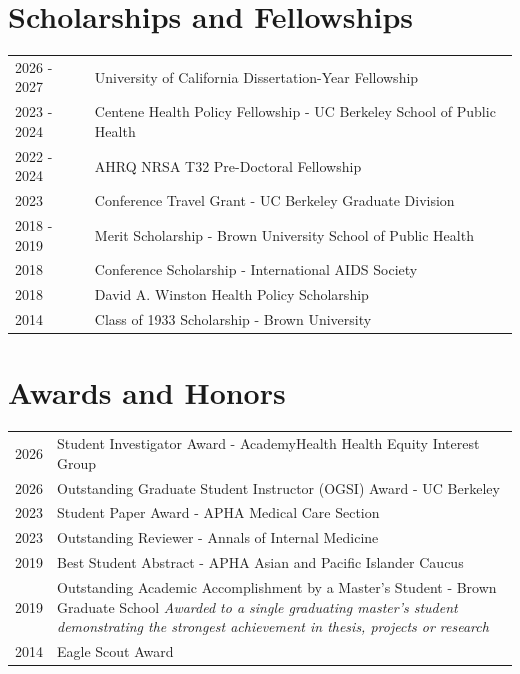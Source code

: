\documentclass[letterpaper,11pt]{article}
\begin{document}
\section{Scholarships and Fellowships}
\begin{tabularx}{\linewidth}{@{}l X@{}}	
2026 - 2027 & University of California Dissertation-Year Fellowship\\
2023 - 2024 & Centene Health Policy Fellowship - UC Berkeley School of Public Health\\
2022 - 2024 & AHRQ NRSA T32 Pre-Doctoral Fellowship\\
2023 & Conference Travel Grant - UC Berkeley Graduate Division \\
2018 - 2019 & Merit Scholarship - Brown University School of Public Health \\
2018 & Conference Scholarship - International AIDS Society \\
2018 & David A. Winston Health Policy Scholarship \\
2014 & Class of 1933 Scholarship - Brown University \\
\end{tabularx}

\section{Awards and Honors}
\begin{tabularx}{\linewidth}{@{}l X@{}}	
2026 & Student Investigator Award - AcademyHealth Health Equity Interest Group \\
2026 & Outstanding Graduate Student Instructor (OGSI) Award - UC Berkeley \\
2023 & Student Paper Award - APHA Medical Care Section  \\
2023 & Outstanding Reviewer - Annals of Internal Medicine  \\
2019 & Best Student Abstract - APHA Asian and Pacific Islander Caucus \\
2019 & Outstanding Academic Accomplishment by a Master’s Student - Brown Graduate School \newline
\small{\textit{Awarded to a single graduating master’s student demonstrating the strongest achievement in thesis, projects or research}} \\
2014 & Eagle Scout Award \\
\end{tabularx}
\end{document}
